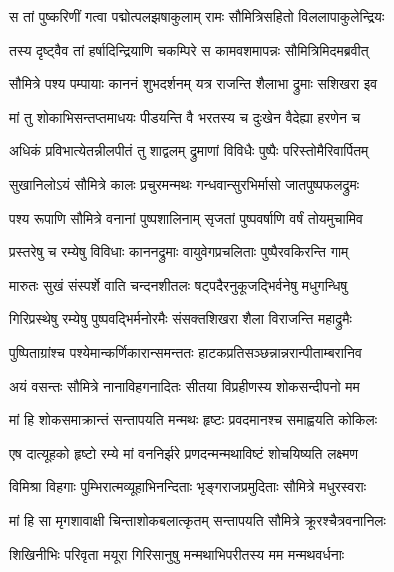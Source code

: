 

\twolineshloka
{स तां पुष्करिणीं गत्वा पद्मोत्पलझषाकुलाम्}
{रामः सौमित्रिसहितो विललापाकुलेन्द्रियः} %

\twolineshloka
{तस्य दृष्ट्वैव तां हर्षादिन्द्रियाणि चकम्पिरे}
{स कामवशमापन्नः सौमित्रिमिदमब्रवीत्} %

\twolineshloka
{सौमित्रे पश्य पम्पायाः काननं शुभदर्शनम्}
{यत्र राजन्ति शैलाभा द्रुमाः सशिखरा इव} %

\twolineshloka
{मां तु शोकाभिसन्तप्तमाधयः पीडयन्ति वै}
{भरतस्य च दुःखेन वैदेह्या हरणेन च} %

\twolineshloka
{अधिकं प्रविभात्येतन्नीलपीतं तु शाद्वलम्}
{द्रुमाणां विविधैः पुष्पैः परिस्तोमैरिवार्पितम्} %

\twolineshloka
{सुखानिलोऽयं सौमित्रे कालः प्रचुरमन्मथः}
{गन्धवान्सुरभिर्मासो जातपुष्पफलद्रुमः} %

\twolineshloka
{पश्य रूपाणि सौमित्रे वनानां पुष्पशालिनाम्}
{सृजतां पुष्पवर्षाणि वर्षं तोयमुचामिव} %

\twolineshloka
{प्रस्तरेषु च रम्येषु विविधाः काननद्रुमाः}
{वायुवेगप्रचलिताः पुष्पैरवकिरन्ति गाम्} %

\twolineshloka
{मारुतः सुखं संस्पर्शे वाति चन्दनशीतलः}
{षट्पदैरनुकूजद्भिर्वनेषु मधुगन्धिषु} %

\twolineshloka
{गिरिप्रस्थेषु रम्येषु पुष्पवद्भिर्मनोरमैः}
{संसक्तशिखरा शैला विराजन्ति महाद्रुमैः} %

\twolineshloka
{पुष्पिताग्रांश्च पश्येमान्कर्णिकारान्समन्ततः}
{हाटकप्रतिसञ्छन्नान्नरान्पीताम्बरानिव} %

\twolineshloka
{अयं वसन्तः सौमित्रे नानाविहगनादितः}
{सीतया विप्रहीणस्य शोकसन्दीपनो मम} %

\twolineshloka
{मां हि शोकसमाक्रान्तं सन्तापयति मन्मथः}
{हृष्टः प्रवदमानश्च समाह्वयति कोकिलः} %

\twolineshloka
{एष दात्यूहको हृष्टो रम्ये मां वननिर्झरे}
{प्रणदन्मन्मथाविष्टं शोचयिष्यति लक्ष्मण} %

\twolineshloka
{विमिश्रा विहगाः पुम्भिरात्मव्यूहाभिनन्दिताः}
{भृङ्गराजप्रमुदिताः सौमित्रे मधुरस्वराः} %

\twolineshloka
{मां हि सा मृगशावाक्षी चिन्ताशोकबलात्कृतम्}
{सन्तापयति सौमित्रे क्रूरश्चैत्रवनानिलः} %

\twolineshloka
{शिखिनीभिः परिवृता मयूरा गिरिसानुषु}
{मन्मथाभिपरीतस्य मम मन्मथवर्धनाः} %

